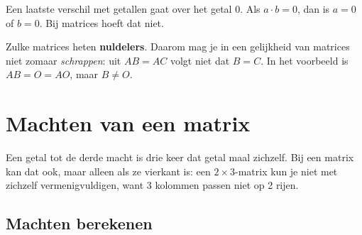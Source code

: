 Een laatste verschil met getallen gaat over het getal 0. Als $a \cdot b = 0$, dan is $a = 0$ of $b = 0$. Bij matrices hoeft dat niet.


Zulke matrices heten \textbf{nuldelers}. Daarom mag je in een gelijkheid van matrices niet zomaar \textit{schrappen}: uit $AB = AC$ volgt niet dat $B = C$. In het voorbeeld is $AB = O = AO$, maar $B \neq O$.

\begin{oefeningen}
\end{oefeningen}

\section{Machten van een matrix}

Een getal tot de derde macht is drie keer dat getal maal zichzelf. Bij een matrix kan dat ook, maar alleen als ze vierkant is: een $2 \times 3$-matrix kun je niet met zichzelf vermenigvuldigen, want 3 kolommen passen niet op 2 rijen.

\subsection{Machten berekenen}


